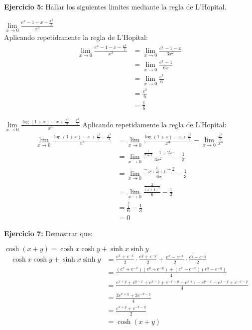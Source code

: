 \documentclass[../main.tex]{subfiles}
\begin{document}
\question \textbf{Ejercicio 5:} Hallar los siguientes limites mediante la regla de L'Hopital.
\begin{partes}
    \parte $\lim\limits_{x \to 0} \frac{e^x-1-x-\frac{x^2}{2}}{x^3}$\\
    Aplicando repetidamente la regla de L'Hopital:
    \begin{align*}
        \lim\limits_{x \to 0} \frac{e^x-1-x-\frac{x^2}{2}}{x^3} &= \lim\limits_{x \to 0} \frac{e^x-1-x}{3x^2}\\
        &= \lim\limits_{x \to 0} \frac{e^x-1}{6x}\\
        &= \lim\limits_{x \to 0} \frac{e^x}{6}\\
        &= \frac{e^0}{6}\\
        &= \frac{1}{6}
    \end{align*}

    \parte $\lim\limits_{x \to 0} \frac{\log(1+x) - x + \frac{x^2}{2} - \frac{x^3}{3}}{x^3}$
    Aplicando repetidamente la regla de L'Hopital:
    \begin{align*}
        \lim\limits_{x \to 0} \frac{\log(1+x) - x + \frac{x^2}{2} - \frac{x^3}{3}}{x^3} &=\lim\limits_{x \to 0}  \frac{\log(1+x) - x + \frac{x^2}{2}}{x^3} - \lim\limits_{x \to 0} \frac{\frac{x^3}{3}}{x^3}\\
        &= \lim\limits_{x \to 0} \frac{\frac{1}{x+1} - 1 + 2x}{3x^2} - \frac{1}{3}\\
        &= \lim\limits_{x \to 0} \frac{-\frac{1}{x^2+2x+1} + 2}{6x} - \frac{1}{3}\\
        &= \lim\limits_{x \to 0} \frac{\frac{2}{(x+1)^3}}{6} - \frac{1}{3}\\
        &= \frac{\frac{2}{1}}{6} - \frac{1}{3}\\
        &= 0
    \end{align*}
\end{partes}

\question \textbf{Ejercicio 7:} Demostrar que:
\begin{partes}
    \parte $\cosh(x+y) = \cosh x\cosh y + \sinh x \sinh y$
    \begin{align*}
        \cosh x\cosh y + \sinh x \sinh y &= \frac{e^x+e^{-x}}{2} \cdot \frac{e^y+e^{-y}}{2} + \frac{e^x - e^{-x}}{2} \cdot \frac{e^y-e^{-y}}{2}\\
        &= \frac{(e^x+e^{-x})(e^y+e^{-y}) + (e^x-e^{-x})(e^y-e^{-y})}{4}\\
        &= \frac{e^{x+y} + e^{y-x} + e^{x-y} + e^{-x-y} + e^{x+y} - e^{y-x} - e^{x-y} + e^{-x-y}}{4}\\
        &= \frac{2e^{x+y} + 2e^{-x-y}}{4}\\
        &= \frac{e^{x+y} + e^{-x-y}}{2}\\
        &= \cosh(x+y)
    \end{align*}
\end{partes}
\end{document}
